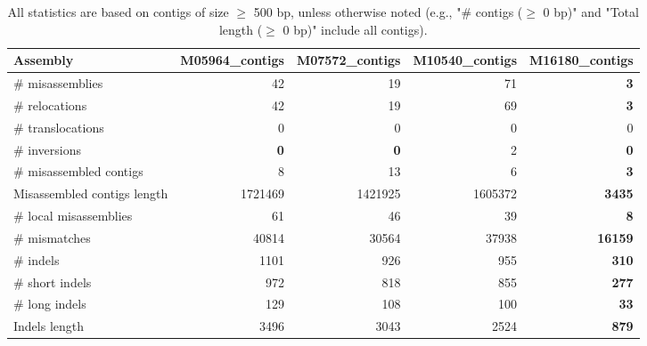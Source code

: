 \documentclass[12pt,a4paper]{article}
\begin{document}
\begin{table}[ht]
\begin{center}
\caption{All statistics are based on contigs of size $\geq$ 500 bp, unless otherwise noted (e.g., "\# contigs ($\geq$ 0 bp)" and "Total length ($\geq$ 0 bp)" include all contigs).}
\begin{tabular}{|l*{4}{|r}|}
\hline
Assembly & M05964\_contigs & M07572\_contigs & M10540\_contigs & M16180\_contigs \\ \hline
\# misassemblies & 42 & 19 & 71 & {\bf 3} \\ \hline
\hspace{5mm}\# relocations & 42 & 19 & 69 & {\bf 3} \\ \hline
\hspace{5mm}\# translocations & 0 & 0 & 0 & 0 \\ \hline
\hspace{5mm}\# inversions & {\bf 0} & {\bf 0} & 2 & {\bf 0} \\ \hline
\# misassembled contigs & 8 & 13 & 6 & {\bf 3} \\ \hline
Misassembled contigs length & 1721469 & 1421925 & 1605372 & {\bf 3435} \\ \hline
\# local misassemblies & 61 & 46 & 39 & {\bf 8} \\ \hline
\# mismatches & 40814 & 30564 & 37938 & {\bf 16159} \\ \hline
\# indels & 1101 & 926 & 955 & {\bf 310} \\ \hline
\hspace{5mm}\# short indels & 972 & 818 & 855 & {\bf 277} \\ \hline
\hspace{5mm}\# long indels & 129 & 108 & 100 & {\bf 33} \\ \hline
Indels length & 3496 & 3043 & 2524 & {\bf 879} \\ \hline
\end{tabular}
\end{center}
\end{table}
\end{document}
